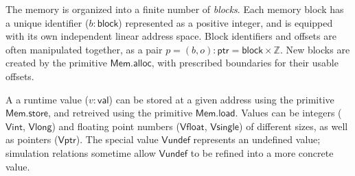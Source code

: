 \documentclass[acmsmall,anonymous]{acmart}
\newcommand{\kw}[1]{\ensuremath{ \textsf{#1} }}
\begin{document}
The memory is organized into a finite number of \emph{blocks}.
Each memory block has a unique identifier ($b : \kw{block}$)
represented as a positive integer,
and is equipped with its own independent linear address space.
Block identifiers and offsets are often manipulated together,
as a pair $p = (b, o) : \kw{ptr} = \kw{block} \times \mathbb{Z}$.
New blocks are created by the primitive $\kw{Mem.alloc}$,
with prescribed boundaries for their usable offsets.

A a runtime value ($v : \kw{val}$) can be stored at
a given address using the primitive \kw{Mem.store},
and retreived using the primitive \kw{Mem.load}.
Values can be integers (\kw{Vint}, \kw{Vlong}) and
floating point numbers (\kw{Vfloat}, \kw{Vsingle})
of different sizes,
as well as pointers (\kw{Vptr}).
The special value \kw{Vundef}
represents an undefined value;
simulation relations sometime allow $\kw{Vundef}$
to be refined into a more concrete value.


%
%
%
%
\end{document}
